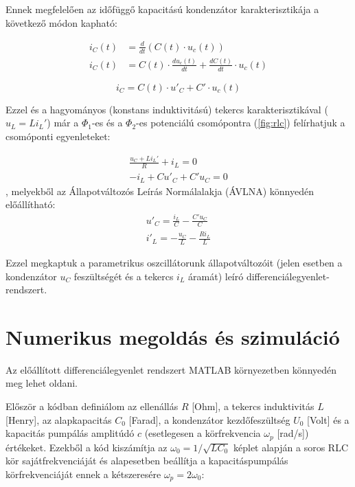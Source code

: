 \documentclass[12pt,a4paper]{article}
\begin{document}
Ennek megfelelően az időfüggő kapacitású kondenzátor karakterisztikája a következő módon kapható:

\begin{equation}
    \begin{split}
        i_C(t) & = \frac{d}{dt}(C(t) \cdot u_c(t)) \\
        i_C(t) & = C(t) \cdot \frac{du_c(t)}{dt} + \frac{dC(t)}{dt} \cdot u_c(t)
    \end{split}
\end{equation}

\begin{equation}
    \boxed{i_C = C(t) \cdot u'_C + C' \cdot u_c(t)}
\end{equation}

\pagebreak

Ezzel és a hagyományos (konstans induktivitású) tekercs karakterisztikával ($u_L = L i_L'$) már a $\Phi_1$-es és a $\Phi_2$-es potenciálú
csomópontra (\ref{fig:rlc}) felírhatjuk a csomóponti egyenleteket:

\begin{equation}
    \begin{split}
        \frac{u_C + Li_L'}{R} + i_L = 0 \\
        -i_L+Cu'_C + C'u_C = 0
    \end{split}
\end{equation}
, melyekből az Állapotváltozós Leírás Normálalakja (ÁVLNA) könnyedén előállítható:
\begin{equation}
    \boxed
    {
        \begin{split}
                u'_C = \frac{i_L}{C} - \frac{C'u_C}{C} \\
                i'_L = -\frac{u_C}{L} - \frac{Ri_L}{L}
        \end{split}
    }
    \label{avlna}
\end{equation}

Ezzel megkaptuk a parametrikus oszcillátorunk állapotváltozóit (jelen esetben a kondenzátor $u_C$ feszültségét és a tekercs $i_L$ áramát)
leíró differenciálegyenlet-rendszert.

\section{Numerikus megoldás és szimuláció}

Az előállított differenciálegyenlet rendszert MATLAB környezetben könnyedén meg lehet oldani.

Először a kódban definiálom az ellenállás $R$ [Ohm], a tekercs induktivitás $L$ [Henry], az alapkapacitás $C_0$ [Farad],
a kondenzátor kezdőfeszültség $U_0$ [Volt] és a kapacitás pumpálás amplitúdó $c$ (esetlegesen a körfrekvencia $\omega_p$ [rad/s]) értékeket.
Ezekből a kód kiszámítja az $\omega_0 = 1 / \sqrt{L C_0}$ képlet alapján a soros RLC kör sajátfrekvenciáját és alapesetben beállítja a kapacitáspumpálás körfrekvenciáját
ennek a kétszeresére $\omega_p = 2 \omega_0$:
\end{document}
